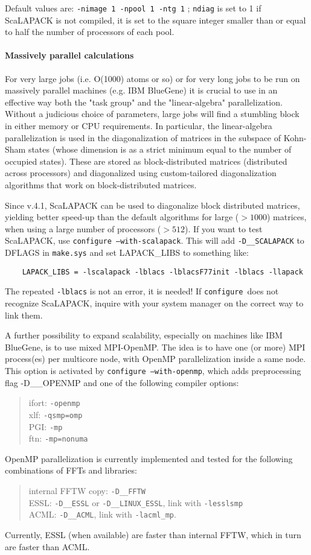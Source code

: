 \documentclass[12pt,a4paper]{article}
\def\configure{\texttt{configure}}
\begin{document}
Default values are: \texttt{-nimage 1 -npool 1 -ntg 1} ; 
\texttt{ndiag} is set to 1 if ScaLAPACK is not compiled,
it is set to the square integer smaller than or equal to  half the number 
of processors of each pool.

\paragraph{Massively parallel calculations}
For very large jobs (i.e. O(1000) atoms or so) or for very long jobs
to be run on massively parallel  machines (e.g. IBM BlueGene) it is
crucial to use in an effective way both the "task group" and the
"linear-algebra" parallelization. Without a judicious choice of
parameters, large jobs will find a stumbling block in either memory or 
CPU requirements. In particular, the linear-algebra parallelization is
used in the diagonalization  of matrices in the subspace of Kohn-Sham
states (whose dimension is as a strict minimum equal to the number of
occupied states). These are stored as block-distributed matrices
(distributed across processors) and diagonalized using custom-tailored
diagonalization algorithms that work on block-distributed matrices.

Since v.4.1, ScaLAPACK can be used to diagonalize block distributed
matrices, yielding better speed-up than the default algorithms for
large ($ > 1000$) matrices, when using a large number of processors 
($> 512$). If you want to test ScaLAPACK,
use \texttt{configure --with-scalapack}. This
will add
\texttt{-D\_\_SCALAPACK} to DFLAGS in \texttt{make.sys} and set LAPACK\_LIBS to something
like:
\begin{verbatim}
    LAPACK_LIBS = -lscalapack -lblacs -lblacsF77init -lblacs -llapack
\end{verbatim}
The repeated \texttt{-lblacs} is not an error, it is needed! If \configure\ does not recognize
ScaLAPACK, inquire with your system manager
on the correct way to link them.

A further possibility to expand scalability, especially on machines
like IBM BlueGene, is to use mixed MPI-OpenMP. The idea is to have
one (or more) MPI process(es) per multicore node, with OpenMP
parallelization inside a same node. This option is activated by  \texttt{configure --with-openmp},
which adds preprocessing flag -D\_\_OPENMP
and one  of the following compiler options:
\begin{quote}
 ifort: \texttt{-openmp}\\
 xlf:   \texttt{-qsmp=omp}\\
 PGI:   \texttt{-mp}\\
 ftn:   \texttt{-mp=nonuma}
\end{quote}
OpenMP parallelization is currently implemented and tested for the following combinations of FFTs
and libraries:
\begin{quote}
 internal FFTW copy: \texttt{-D\_\_FFTW}\\
 ESSL: \texttt{-D\_\_ESSL} or \texttt{-D\_\_LINUX\_ESSL}, link 
 with \texttt{-lesslsmp}\\
 ACML: \texttt{-D\_\_ACML}, link with \texttt{-lacml\_mp}.
\end{quote}
Currently, ESSL (when available) are faster than internal FFTW,
which in turn are faster than ACML.
\end{document}
